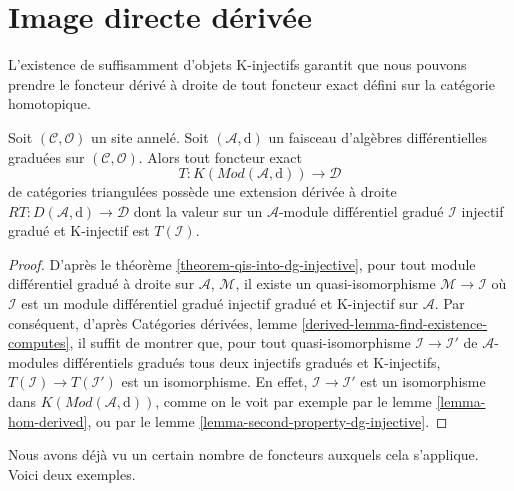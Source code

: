 \section{Image directe dérivée}
\label{section-derived-pushforward}

\noindent
L'existence de suffisamment d'objets K-injectifs garantit que nous pouvons prendre le foncteur
dérivé à droite de tout foncteur exact défini sur la catégorie homotopique.

\begin{lemma}
\label{lemma-right-derived}
Soit $(\mathcal{C}, \mathcal{O})$ un site annelé. Soit
$(\mathcal{A}, \text{d})$ un faisceau d'algèbres différentielles graduées sur
$(\mathcal{C}, \mathcal{O})$. Alors tout foncteur exact
$$
T : K(\textit{Mod}(\mathcal{A}, \text{d})) \longrightarrow \mathcal{D}
$$ de
catégories triangulées possède une extension dérivée à droite
$RT : D(\mathcal{A}, \text{d}) \to \mathcal{D}$
dont la valeur sur un
$\mathcal{A}$-module différentiel gradué $\mathcal{I}$ injectif gradué et K-injectif
est $T(\mathcal{I})$.
\end{lemma}

\begin{proof}
D'après le théorème \ref{theorem-qis-into-dg-injective},
pour tout module différentiel gradué à droite sur $\mathcal{A}$,
$\mathcal{M}$, il existe un
quasi-isomorphisme $\mathcal{M} \to \mathcal{I}$ où $\mathcal{I}$
est un module différentiel
gradué injectif gradué et K-injectif sur $\mathcal{A}$.
Par conséquent, d'après Catégories dérivées, lemme \ref{derived-lemma-find-existence-computes},
il suffit de montrer
que, pour tout quasi-isomorphisme $\mathcal{I} \to \mathcal{I}'$
de $\mathcal{A}$-modules
différentiels gradués tous deux
injectifs gradués et K-injectifs, $T(\mathcal{I}) \to T(\mathcal{I}')$
est un isomorphisme. En effet, $\mathcal{I} \to \mathcal{I}'$
est un isomorphisme dans $K(\textit{Mod}(\mathcal{A}, \text{d}))$,
comme on le voit par exemple par le lemme \ref{lemma-hom-derived},
ou par le lemme \ref{lemma-second-property-dg-injective}.
\end{proof}

\noindent
Nous avons déjà vu un certain nombre de foncteurs auxquels cela s'applique.
Voici deux exemples.

